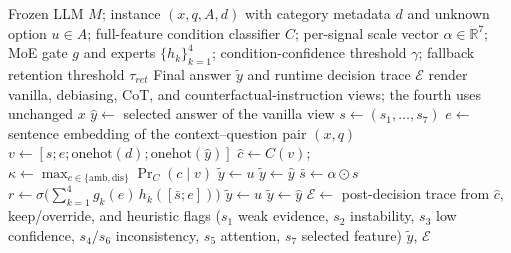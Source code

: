 \documentclass{ieeeaccess}
\newcommand{\method}{Condition-Aware Selective Abstention}
\begin{document}
\begin{algorithm}[!t]
\caption{Test-time inference of the released \method{} hybrid for one BBQ item. The frozen LLM produces four prompt views, of which vanilla QA supplies the primary answer; the hybrid eagerly extracts all seven signals and a context--question embedding, predicts the ambiguous/disambiguated condition from its full no-oracle feature vector, applies the condition-only rule when prediction confidence is high, and otherwise compares the MoE retention score with one validation-selected fallback threshold. Thus the gate selects the decision rule but is not an early-exit computation gate. The output is a kept or unknown answer plus a post-decision heuristic audit trace; a benchmark label is added only after evaluation and never affects deployment.}
\label{alg:casa}
\footnotesize
\begin{algorithmic}[1]
\REQUIRE Frozen LLM $M$; instance $(x,q,A,d)$ with category metadata $d$ and unknown option $u\in A$; full-feature condition classifier $C$; per-signal scale vector $\alpha\in\mathbb{R}^7$; MoE gate $g$ and experts $\{h_k\}_{k=1}^{4}$; condition-confidence threshold $\gamma$; fallback retention threshold $\tau_{ret}$
\ENSURE Final answer $\tilde{y}$ and runtime decision trace $\mathcal{E}$
\STATE render vanilla, debiasing, CoT, and counterfactual-instruction views; the fourth uses unchanged $x$
\STATE $\hat{y}\gets$ selected answer of the vanilla view 
\STATE $s\gets(s_1,\ldots,s_7)$ 
\STATE $e\gets$ sentence embedding of the context--question pair $(x,q)$
\STATE $v\gets[s;e;\mathrm{onehot}(d);\mathrm{onehot}(\hat{y})]$
\STATE $\hat{c}\gets C(v)$; \quad $\kappa\gets\max_{c\in\{\mathrm{amb},\mathrm{dis}\}}\Pr_C(c\mid v)$
\IF{$\kappa\ge\gamma$}
        \STATE $\tilde{y}\gets u$ 
    \ELSE
        \STATE $\tilde{y}\gets\hat{y}$ 
    \ENDIF
\ELSE
    \STATE $\bar{s}\gets\alpha\odot s$
    \STATE $r\gets\sigma\!\Big(\sum_{k=1}^{4} g_k(e)\,h_k([\bar{s};e])\Big)$
        \STATE $\tilde{y}\gets u$ 
    \ELSE
        \STATE $\tilde{y}\gets\hat{y}$ 
    \ENDIF
\ENDIF
\STATE $\mathcal{E}\gets$ post-decision trace from $\hat{c}$, keep/override, and heuristic flags ($s_1$ weak evidence, $s_2$ instability, $s_3$ low confidence, $s_4/s_6$ inconsistency, $s_5$ attention, $s_7$ selected feature)
\RETURN $\tilde{y}$, $\mathcal{E}$
\end{algorithmic}
\end{algorithm}
\end{document}
